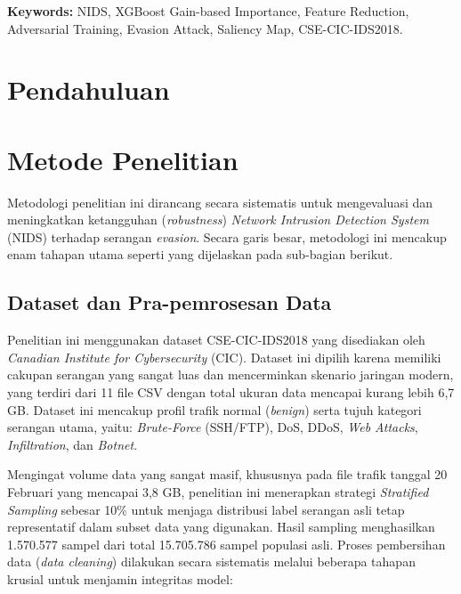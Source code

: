 \documentclass[11pt, a4paper]{article}
\begin{document}
  \vspace{0.15cm}
  \noindent\small\textbf{Keywords:} NIDS, XGBoost Gain-based Importance, Feature Reduction, Adversarial Training, Evasion Attack, Saliency Map, CSE-CIC-IDS2018.

  \vspace{0.4cm}


\section{Pendahuluan}


\section{Metode Penelitian}
Metodologi penelitian ini dirancang secara sistematis untuk mengevaluasi dan meningkatkan ketangguhan (\textit{robustness}) \textit{Network Intrusion Detection System} (NIDS) terhadap serangan \textit{evasion}. Secara garis besar, metodologi ini mencakup enam tahapan utama seperti yang dijelaskan pada sub-bagian berikut.

\subsection{Dataset dan Pra-pemrosesan Data}
Penelitian ini menggunakan dataset CSE-CIC-IDS2018 yang disediakan oleh \textit{Canadian Institute for Cybersecurity} (CIC). Dataset ini dipilih karena memiliki cakupan serangan yang sangat luas dan mencerminkan skenario jaringan modern, yang terdiri dari 11 file CSV dengan total ukuran data mencapai kurang lebih 6,7 GB. Dataset ini mencakup profil trafik normal (\textit{benign}) serta tujuh kategori serangan utama, yaitu: \textit{Brute-Force} (SSH/FTP), DoS, DDoS, \textit{Web Attacks}, \textit{Infiltration}, dan \textit{Botnet}.

Mengingat volume data yang sangat masif, khususnya pada file trafik tanggal 20 Februari yang mencapai 3,8 GB, penelitian ini menerapkan strategi \textit{Stratified Sampling} sebesar 10\% untuk menjaga distribusi label serangan asli tetap representatif dalam subset data yang digunakan. Hasil sampling menghasilkan 1.570.577 sampel dari total 15.705.786 sampel populasi asli. Proses pembersihan data (\textit{data cleaning}) dilakukan secara sistematis melalui beberapa tahapan krusial untuk menjamin integritas model:
\end{document}
